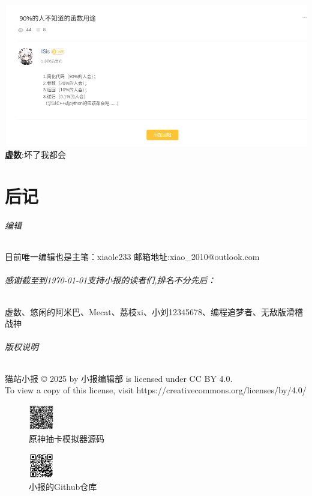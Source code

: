 \documentclass[UTF8]{ctexart}
\begin{document}
\includegraphics[width=0.8\textwidth\\]{assets/02/toliet-4.png} \\
\textbf{虚数}:坏了我都会
\pagebreak
\part{后记}
\paragraph{编辑} 目前唯一编辑也是主笔：xiaole233 邮箱地址:xiao\_2010@outlook.com
\paragraph{感谢截至到\today 支持小报的读者们,排名不分先后：}
\begin{center}虚数、悠​闲​的​阿​米​巴​、Mecat、荔枝xi、小刘12345678、编程追梦者、无敌版滑稽战神
\end{center}
\paragraph{版权说明} 
猫站小报 © 2025 by 小报编辑部 is licensed under CC BY 4.0.\\ To view a copy of this license, visit https://creativecommons.org/licenses/by/4.0/ \\
\begin{center}
\begin{figure}[htbp]
	\centering
	\includegraphics[width=0.1\textwidth]{assets/02/yuanshen-qrc.png}
	\caption{原神抽卡模拟器源码}
\end{figure}
\begin{figure}[htbp]
	\centering
	\includegraphics[width=0.1\textwidth]{assets/repo-qrc.png}
	\caption{小报的Github仓库}
\end{figure}
\end{center}
	
\end{document}

